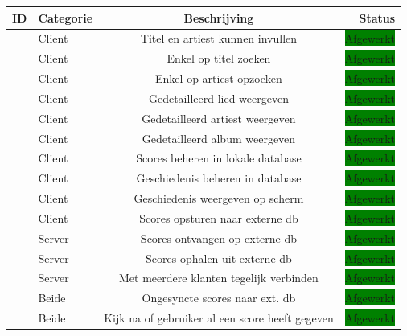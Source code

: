 \documentclass[11pt,a4paper]{article}
\newcommand{\boxgreen}{\colorbox{green}{\color{black}Afgewerkt}}
\newcommand{\boxyellow}{\colorbox{yellow}{\color{black}Aan bezig}}
\newcommand{\boxred}{\colorbox{red}{\color{black}Onafgewerkt}}
\newcounter{reqc}
\newcommand{\reqID} {%
   \stepcounter{reqc}%
   \thereqc}
\begin{document}
	\begin{tabular}{| l | l | c | r |}
	\hline
	ID 		& 	Categorie	&	Beschrijving						& Status 		\\ \hline \hline
	\reqID	&	Client		&	Titel en artiest kunnen invullen	& \boxgreen 	\\ \hline
	\reqID 	&	Client		&	Enkel op titel zoeken				& \boxgreen		\\ \hline
	\reqID	& 	Client		&	Enkel op artiest opzoeken 			& \boxgreen		\\ \hline
	\reqID 	& 	Client		&	Gedetailleerd lied weergeven		& \boxgreen 	\\ \hline
	\reqID 	& 	Client		&	Gedetailleerd artiest weergeven		& \boxgreen 	\\ \hline
	\reqID 	& 	Client		&	Gedetailleerd album weergeven		& \boxgreen 	\\ \hline
	\reqID	& 	Client		&	Scores beheren in lokale database	& \boxgreen  	\\ \hline
	\reqID	& 	Client		&	Geschiedenis beheren in database	& \boxgreen  	\\ \hline
	\reqID	& 	Client		&	Geschiedenis weergeven op scherm	& \boxgreen  	\\ \hline
	\reqID	& 	Client		&	Scores opsturen naar externe db		& \boxgreen		\\ \hline
	\reqID	& 	Server		&	Scores ontvangen op externe db		& \boxgreen		\\ \hline
	\reqID	&	Server		&	Scores ophalen uit externe db		& \boxgreen		\\ \hline
	\reqID	& 	Server		& 	Met meerdere klanten tegelijk verbinden	& \boxgreen		\\ \hline
	\reqID	& 	Beide		& 	Ongesyncte scores naar ext. db		& \boxgreen		\\ \hline
	\reqID	&	Beide		&	Kijk na of gebruiker al een score heeft gegeven	& \boxgreen		\\ \hline
	
	\end{tabular} \\ \newline
\end{document}
